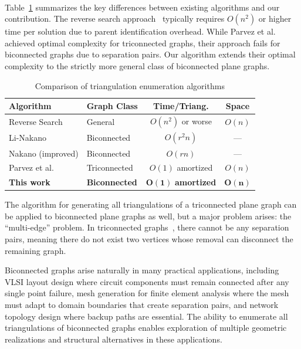 ﻿﻿\documentclass[12pt,a4paper]{article}
\theoremstyle{definition}
\theoremstyle{remark}
\begin{document}
Table~\ref{tab:comparison} summarizes the key differences between existing algorithms and our contribution. The reverse search approach~\cite{avis1996} typically requires $O(n^2)$ or higher time per solution due to parent identification overhead. While Parvez et al.~\cite{parvez2011} achieved optimal complexity for triconnected graphs, their approach fails for biconnected graphs due to separation pairs. Our algorithm extends their optimal complexity to the strictly more general class of biconnected plane graphs.

\begin{table}[h]
	\centering
	\caption{Comparison of triangulation enumeration algorithms}
	\label{tab:comparison}
	\begin{tabular}{|l|l|c|c|}
		\hline
		\textbf{Algorithm}              & \textbf{Graph Class} & \textbf{Time/Triang.}              & \textbf{Space}  \\
		\hline
		Reverse Search~\cite{avis1996}  & General              & $O(n^2)$ or worse                  & $O(n)$          \\
		Li-Nakano~\cite{li2001}         & Biconnected          & $O(r^2 n)$                         & ---             \\
		Nakano (improved)               & Biconnected          & $O(rn)$                            & ---             \\
		Parvez et al.~\cite{parvez2011} & Triconnected         & $O(1)$ amortized                   & $O(n)$          \\
		\textbf{This work}              & \textbf{Biconnected} & $\mathbf{O(1)}$ \textbf{amortized} & $\mathbf{O(n)}$ \\
		\hline
	\end{tabular}
\end{table}

The algorithm for generating all triangulations of a triconnected plane graph can be applied to biconnected plane graphs as well, but a major problem arises: the ``multi-edge'' problem. In triconnected graphs~\cite{hopcroft1974}, there cannot be any separation pairs, meaning there do not exist two vertices whose removal can disconnect the remaining graph.

Biconnected graphs arise naturally in many practical applications, including VLSI layout design where circuit components must remain connected after any single point failure, mesh generation for finite element analysis where the mesh must adapt to domain boundaries that create separation pairs, and network topology design where backup paths are essential. The ability to enumerate all triangulations of biconnected graphs enables exploration of multiple geometric realizations and structural alternatives in these applications.
\end{document}
